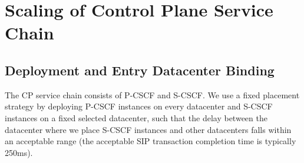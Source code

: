 \section{Scaling of Control Plane Service Chain}
\label{System-Design}

\subsection{Deployment and Entry Datacenter Binding}

The CP service chain consists of P-CSCF and S-CSCF. We use a fixed placement strategy by deploying P-CSCF instances on every datacenter and S-CSCF instances on a fixed selected datacenter, such that the delay between the datacenter where we place S-CSCF instances and other datacenters falls within an acceptable range (the acceptable SIP transaction completion time is typically 250ms).

